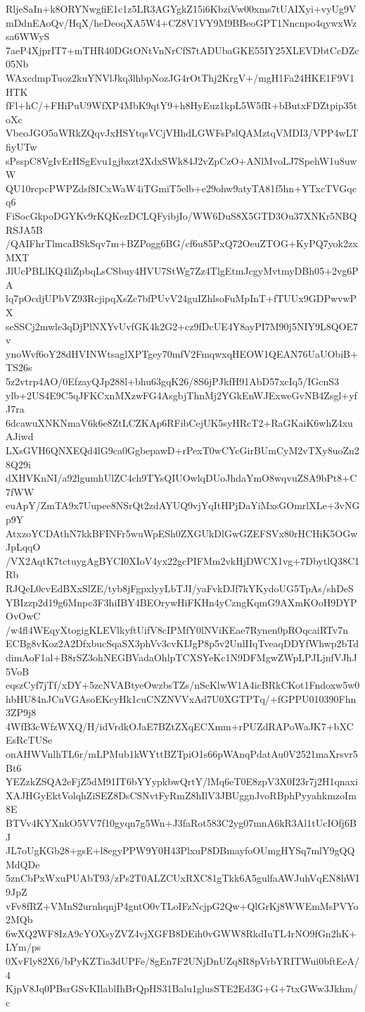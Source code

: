 RljeSaIn+k8ORYNwgfiE1c1z5LR3AGYgkZ15i6KbziVw00xms7tUAIXyi+vyUg9V
mDdnEAoQv/HqX/heDeoqXA5W4+CZ8V1VY9M9BBeoGPT1Nncnpo4qywxWzsa6WWyS
7aeP4XjprIT7+mTHR40DGtONtVnNrCfS7tADUbaGKE55IY25XLEVDbtCcDZc05Nb
WAxcdmpTuoz2kuYNVlJkq3lhbpNozJG4rOtThj2KrgV+/mgH1Fa24HKE1F9V1HTK
fFl+hC/+FHiPuU9WfXP4MbK9qtY9+h8HyEuz1kpL5W5fR+bButxFDZtpip35toXc
VbeoJGO5aWRkZQqvJxHSYtqsVCjVHhdLGWFsPslQAMztqVMDI3/VPP4wLTfiyUTw
sPsspC8VgIvErHSgEvu1gjbxzt2XdxSWk84J2vZpCzO+ANlMvoLJ7SpehW1u8uwW
QU10rcpcPWPZdsf8ICxWaW4iTGmiT5elb+e29ohw9atyTA81f5hn+YTxcTVGqcq6
FiSocGkpoDGYKv9rKQKezDCLQFyibjIo/WW6DuS8X5GTD3Ou37XNKr5NBQRSJA5B
/QAIFhrTlmcaBSkSqv7m+BZPogg6BG/cf6u85PxQ72OeuZTOG+KyPQ7yok2zxMXT
JlUcPBLlKQ4liZpbqLsCSbuy4HVU7StWg7Zz4TlgEtmJcgyMvtmyDBh05+2vg6PA
lq7pOcdjUPbVZ93RcjipqXsZc7bfPUvV24guIZhlsoFuMpInT+fTUUx9GDPwvwPX
seSSCj2mwle3qDjPlNXYvUvfGK4k2G2+cz9fDcUE4Y8ayPI7M90j5NIY9L8QOE7v
ynoWvf6oY28dHVINWtsaglXPTgey70mfV2FmqwxqHEOW1QEAN76UaUObiB+TS26s
5z2vtrp4AO/0EfzayQJp288l+bhu63gqK26/8S6jPJkfH91AbD57xcIq5/IGcnS3
ylb+2US4E9C5qJFKCxnMXzwFG4AsgbjThnMj2YGkEnWJExweGvNB4Zsgl+yfJ7ra
6dcawuXNKNmaV6k6e8ZtLCZKAp6RFibCejUK5syHRcT2+RaGKaiK6whZ4xuAJiwd
LXsGVH6QNXEQd4lG9ca0GgbepawD+rPexT0wCYcGirBUmCyM2vTXy8uoZn28Q29i
dXHVKnNI/a92lgumhUlZC4ch9TYsQIUOwlqDUoJhdaYmO8wqvuZSA9bPt8+C7fWW
euApY/ZmTA9x7Uupee8NSrQt2zdAYUQ9vjYqItHPjDaYiMxsGOmrlXLe+3vNGp9Y
AtxzoYCDAthN7kkBFINFr5wuWpESh0ZXGUkDlGwGZEFSVx80rHCHiK5OGwJpLqqO
/VX2AqtK7tctuygAgBYCI0XIoV4yx22gcPIFMm2vkHjDWCX1vg+7DbytlQ38C1Rb
RJQeL0cvEdBXxSlZE/tyb8jFgpxlyyLbTJI/yaFvkDJf7kYKydoUG5TpAs/shDeS
YBIzzp2d19g6Mnpc3F3hiIBY4BEOrywHiFKHn4yCzngKqmG9AXmKOoH9DYPOvOwC
/w4fl4WEqyXtogigKLEVlkyftUifV8cIPMfY0lNViKEae7Rynen0pROqcaiRTv7n
ECBg8vKoz2A2DfxbucSqaSX3phVv3cvKIJgP8p5v2UnlIIqTveaqDDYfWhwp2bTd
dimAoF1al+B8rSZ3ohNEGBVadaOhlpTCXSYeKc1N9DFMgwZWpLPJLjnfVJhJ5VoB
eqszCyf7jTf/xDY+5zcNVABtyeOwzbsTZs/nSeKlwW1A4icBRkCKot1Fndoxw5w0
hbHU84nJCuVGAsoEKcyHk1cuCNZNVVxAd7U0XGTPTq/+fGPPU010390Fhn3ZP9j8
4WfB3cWfzWXQ/H/idVrdkOJaE7BZtZXqECXmm+rPUZdRAPoWaJK7+bXCEsRcTUSe
onAHWVnlhTL6r/mLPMub1kWYttBZTpiO1s66pWAnqPdatAu0V2521maXrsvr5Bt6
YEZzkZSQA2eFjZ5dM91IT6bYYypkbwQrtY/lMq6eT0E8zpV3X0I23r7j2H1qnaxi
XAJHGyEktVolqhZiSEZ8DsCSNvtFyRmZ8hIlV3JBUggnJvoRBphPyyahkmzoIm8E
BTVv4KYXnkO5VV7f10gyqn7g5Wn+J3faRot583C2yg07mnA6kR3Al1tUcIOfj6BJ
JL7oUgKGb28+gsE+l8egyPPW9Y0H43PlxuP8DBmayfoOUmgHYSq7mlY9gQQMdQDe
5znCbPxWxuPUAbT93/zPs2T0ALZCUxRXC81gTkk6A5gulfaAWJuhVqEN8hWI9JpZ
vFv8fRZ+VMnS2urnhqnjP4gntO0vTLoIFzNcjpG2Qw+QlGrKj8WWEmMsPVYo2MQb
6wXQ2WF8IzA9cYOXsyZVZ4vjXGFB8DEih0vGWW8RkdIuTL4rNO9fGn2hK+LYm/ps
0XvFly82X6/bPyKZTia3dUPFe/8gEn7F2UNjDnUZq8R8pVrbYRITWui0bftEeA/4
KjpV8Jq0PBsrGSvKIlablIhBrQpHS31Balu1glusSTE2Ed3G+G+7txGWw3Jkhm/c
